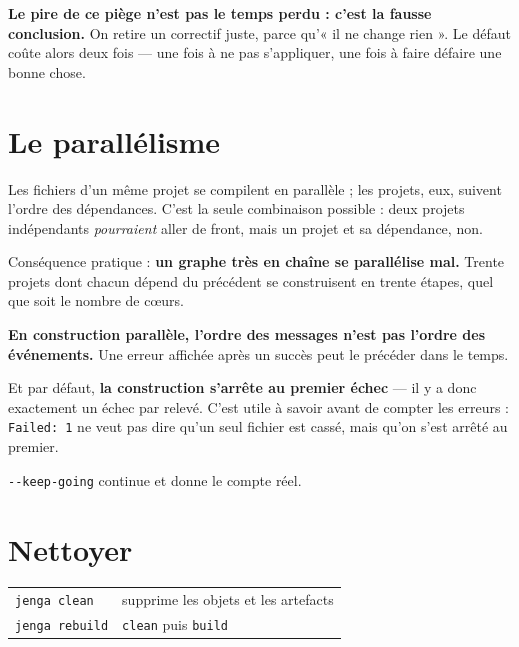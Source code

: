\begin{nkretenir}
\textbf{Le pire de ce piège n'est pas le temps perdu : c'est la fausse
conclusion.} On retire un correctif juste, parce qu'« il ne change rien ». Le
défaut coûte alors deux fois --- une fois à ne pas s'appliquer, une fois à faire
défaire une bonne chose.
\end{nkretenir}

\section{Le parallélisme}

\begin{nkretenir}
Les fichiers d'un même projet se compilent en parallèle ; les projets, eux,
suivent l'ordre des dépendances. C'est la seule combinaison possible : deux
projets indépendants \emph{pourraient} aller de front, mais un projet et sa
dépendance, non.

Conséquence pratique : \textbf{un graphe très en chaîne se parallélise mal.}
Trente projets dont chacun dépend du précédent se construisent en trente étapes,
quel que soit le nombre de c\oe urs.
\end{nkretenir}

\begin{nkpiege}
\textbf{En construction parallèle, l'ordre des messages n'est pas l'ordre des
événements.} Une erreur affichée après un succès peut le précéder dans le temps.

Et par défaut, \textbf{la construction s'arrête au premier échec} --- il y a donc
exactement un échec par relevé. C'est utile à savoir avant de compter les
erreurs : \texttt{Failed: 1} ne veut pas dire qu'un seul fichier est cassé, mais
qu'on s'est arrêté au premier.

\texttt{-{}-keep-going} continue et donne le compte réel.
\end{nkpiege}

\section{Nettoyer}

\begin{center}
\begin{tabular}{@{}ll@{}}
\toprule
\texttt{jenga clean} & supprime les objets et les artefacts \\
\texttt{jenga rebuild} & \texttt{clean} puis \texttt{build} \\
\bottomrule
\end{tabular}
\end{center}


